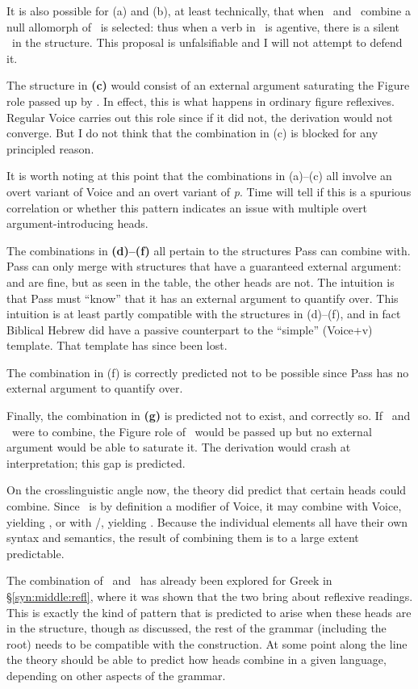It is also possible for (a) and (b), at least technically, that when \vd~and \va~combine a null allomorph of \va~is selected: thus when a verb in \thif~is agentive, there is a silent \va~in the structure. This proposal is unfalsifiable and I will not attempt to defend it.

The structure in \textbf{(c)} would consist of an external argument saturating the Figure role passed up by \pz. In effect, this is what happens in ordinary figure reflexives. Regular Voice carries out this role since if it did not, the derivation would not converge. But I do not think that the combination in (c) is blocked for any principled reason.

It is worth noting at this point that the combinations in (a)--(c) all involve an overt variant of Voice and an overt variant of \emph{p}. Time will tell if this is a spurious correlation or whether this pattern indicates an issue with multiple overt argument-introducing heads.

The combinations in \textbf{(d)--(f)} all pertain to the structures Pass can combine with. Pass can only merge with structures that have a guaranteed external argument: {\vd} and {\va} are fine, but as seen in the table, the other heads are not. The intuition is that Pass must ``know'' that it has an external argument to quantify over. This intuition is at least partly compatible with the structures in (d)--(f), and in fact Biblical Hebrew did have a passive counterpart to the ``simple'' (Voice+v) template. That template has since been lost.

The combination in (f) is correctly predicted not to be possible since Pass has no external argument to quantify over.

Finally, the combination in \textbf{(g)} is predicted not to exist, and correctly so. If \vz~and \pz~were to combine, the Figure role of \pz~would be passed up but no external argument would be able to saturate it. The derivation would crash at interpretation; this gap is predicted.

On the crosslinguistic angle now, the theory did predict that certain heads could combine. Since \va~is by definition a modifier of Voice, it may combine with Voice, yielding \tpie, or with \vz/\pz, yielding \thit. Because the individual elements all have their own syntax and semantics, the result of combining them is to a large extent predictable.

The combination of \vz~and \va~has already been explored for Greek in \S\ref{syn:middle:refl}, where it was shown that the two bring about reflexive readings. This is exactly the kind of pattern that is predicted to arise when these heads are in the structure, though as discussed, the rest of the grammar (including the root) needs to be compatible with the construction. At some point along the line the theory should be able to predict how heads combine in a given language, depending on other aspects of the grammar.

